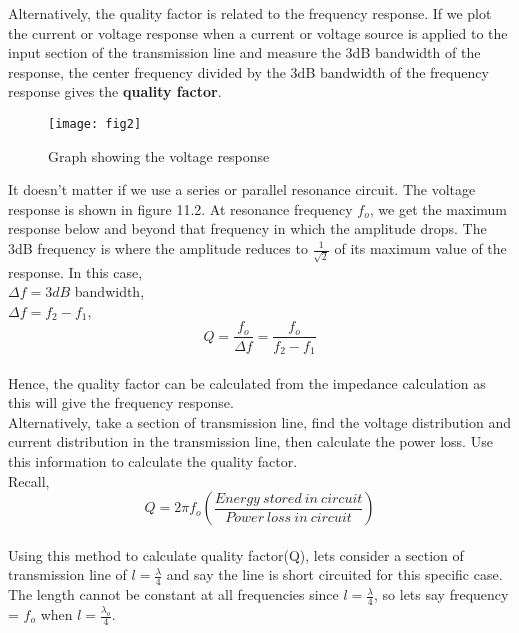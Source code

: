 	Alternatively, the quality factor is related to the frequency response. If we plot the current or voltage response when a current or voltage source is applied to the input section of the transmission line and measure the 3dB bandwidth of the response, the center frequency divided by the 3dB bandwidth of the frequency response gives the \textbf{quality factor}. 
	\begin{figure}[h]
		\centering
		\texttt{[image: fig2]}
		\caption{Graph showing the voltage response}
	\end{figure}It doesn't matter if we use a series or parallel resonance circuit. The voltage response is shown in figure 11.2. At resonance frequency $ f_{o} $, we get the maximum response below and beyond that frequency in which the amplitude drops. The 3dB frequency is where the amplitude reduces to $ \frac{1}{\sqrt{2}} $ of its maximum value of the response. In this case,\\ $ \Delta f=3dB $ bandwidth,\\ $ \Delta f=f_{2}-f_{1} $,\\
	\begin{equation}
	\boxed{	Q=\frac{f_{o}}{\Delta f}=\frac{f_{o}}{f_{2}-f_{1}}}\end{equation}\\
	Hence, the quality factor can be calculated from the impedance calculation as this will give the frequency response.\\
	Alternatively, take a section of transmission line, find the voltage distribution and current distribution in the transmission line, then calculate the power loss. Use this information to calculate the quality factor.\\
	Recall,
	\begin{equation}
	Q=2\pi f_{o}\left(\frac{Energy\ stored\ in\ circuit}{Power\ loss\ in\ circuit}\right)
	\end{equation} \\
	Using this method to calculate quality factor(Q),
	lets consider a section of transmission line of $ l=\frac{\lambda}{4} $ and say the line is short circuited for this specific case.\\
	The length cannot be constant at all frequencies since $ l=\frac{\lambda}{4} $, so lets say frequency = $ f_{o} $ when $ l=\frac{\lambda_{o}}{4} $. 
	\\
	

     
     

